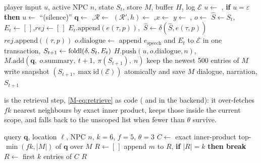 \documentclass[letterpaper,journal,onecolumn]{IEEEtran}
\begin{document}
\begin{algorithm}[H]
\caption{One turn of the engine}\label{alg:turn}
\begin{algorithmic}[1]
\Require player input $u$, active NPC $n$, state $S_t$, store $M$, buffer $H$, log $\mathcal{E}$
\State $u\gets$ , \textbf{if} $u=\varepsilon$ \textbf{then} $u\gets$ ``(silence)''
\State $\mathbf{q}\gets$ ,\quad $\mathcal{R}\gets$  
\State $(\mathcal{R}',h)\gets$ ,\quad $x\gets$ 
\State $y\gets$ , \quad $o\gets$  
\State $\hat S\gets S_t$,\quad $E_t\gets[\,]$,\quad $\mathit{rej}\gets[\,]$
   $E_t.\mathrm{append}(e(\tau,p))$,\ $\hat S\gets\delta(\hat S,e(\tau,p))$ \Else\ $\mathit{rej}.\mathrm{append}((\tau,p))$ \EndIf
\EndFor
{} $o.\mathrm{dialogue}\gets$  
\EndIf
\State append $e_{\text{speech}}$ and $E_t$ to $\mathcal{E}$ in one transaction, \quad $S_{t+1}\gets\operatorname{foldl}(\delta,S_t,E_t)$
\State $H.\mathrm{push}(u,o.\mathrm{dialogue},n)$,\quad $M.\mathrm{add}(\mathbf{q},\ o.\mathrm{summary},\ t{+}1,\ \pi(S_{t+1}),\ n)$
 keep the newest 500 entries of $M$ \EndIf
{} write snapshot $(S_{t+1},\max\mathrm{id}(\mathcal{E}))$ atomically and save $M$ \EndIf
\State \Return dialogue, narration, $S_{t+1}$
\end{algorithmic}
\end{algorithm}

 is the retrieval step, \eqref{M-eq:retrieve} as code ( and  in the backend): it over-fetches $fk$ nearest neighbours by exact inner product, keeps those inside the current scope, and falls back to the unscoped list when fewer than $\theta$ survive.

\begin{algorithm}[H]
\caption{Scoped retrieval}\label{alg:retrieve}
\begin{algorithmic}[1]
\Require query $\mathbf{q}$, location $\ell$, NPC $n$, $k=6$, $f=5$, $\theta=3$
\State $C\gets$ exact inner-product top-$\min(fk,|M|)$ of $\mathbf{q}$ over $M$
\State $R\gets[\,]$
   append $m$ to $R$, \textbf{if} $|R|=k$ \textbf{then break} \EndIf
\EndFor
{} $R\gets$ first $k$ entries of $C$ 
\EndIf
\State \Return $R$
\end{algorithmic}
\end{algorithm}
\end{document}
